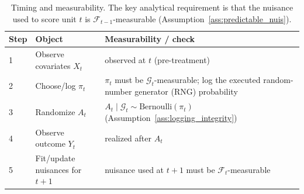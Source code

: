 \documentclass[11pt]{article}
\numberwithin{equation}{section}
\theoremstyle{plain}
\theoremstyle{definition}
\theoremstyle{remark}
\newcommand{\cF}{\mathcal{F}}
\newcommand{\cG}{\mathcal{G}}
\begin{document}
\begin{table}[!htbp]
\centering
\small
\begin{tabular}{@{}p{}p{}p{}@{}}
\toprule
Step & Object & Measurability / check \\
\midrule
1 & Observe covariates $X_t$ & observed at $t$ (pre-treatment) \\
2 & Choose/log $\pi_t$ & $\pi_t$ must be $\cG_t$-measurable; log the executed random-number generator (RNG) probability \\
3 & Randomize $A_t$ & $A_t\mid\cG_t\sim \mathrm{Bernoulli}(\pi_t)$ (Assumption~\ref{ass:logging_integrity}) \\
4 & Observe outcome $Y_t$ & realized after $A_t$ \\
5 & Fit/update nuisances for $t{+}1$ & nuisance used at $t{+}1$ must be $\cF_t$-measurable \\
\bottomrule
\end{tabular}
\caption{Timing and measurability. The key analytical requirement is that the nuisance used to score unit $t$ is $\cF_{t-1}$-measurable (Assumption~\ref{ass:predictable_nuis}).}
\label{tab:timing}
\end{table}
\end{document}
